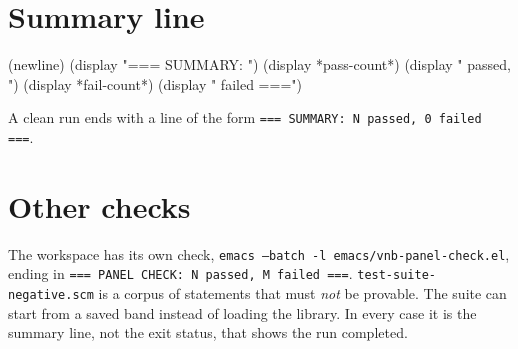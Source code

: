 \section{Summary line}

\begin{VNBcode}
(newline)
(display "=== SUMMARY: ")
(display *pass-count*) (display " passed, ")
(display *fail-count*) (display " failed ===\n")
\end{VNBcode}

\noindent A clean run ends with a line of the form \verb|=== SUMMARY: N passed, 0 failed ===|.

\section{Other checks}

The workspace has its own check, \texttt{emacs --batch -l
emacs/vnb-panel-check.el}, ending in \texttt{=== PANEL CHECK: N passed, M
failed ===}.  \texttt{test-suite-negative.scm} is a corpus of statements
that must \emph{not} be provable.  The suite can start from a saved band
instead of loading the library.  In every case it is the summary line,
not the exit status, that shows the run completed.


